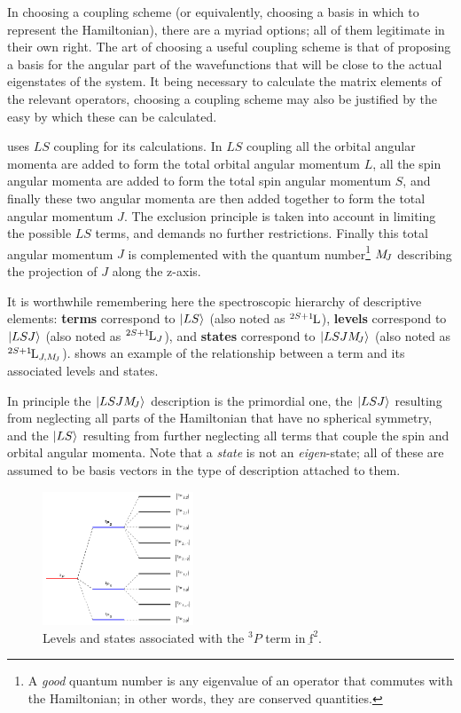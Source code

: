 \documentclass[11pt, twoside,openright]{article}
\begin{document}
In choosing a coupling scheme (or equivalently, choosing a basis in which to represent the Hamiltonian), there are a myriad options; all of them  legitimate in their own right. The art of choosing a useful coupling scheme is that of proposing a basis for the angular part of the wavefunctions that will be close to the actual eigenstates of the system. It being necessary to calculate the matrix elements of the relevant operators, choosing a coupling scheme may also be justified by the easy by which these can be calculated.

\qlanth uses $LS$ coupling for its calculations. In $LS$ coupling all the orbital angular momenta are added to form the total orbital angular momentum $L$, all the spin angular momenta are added to form the total spin angular momentum $S$, and finally these two angular momenta are then added together to form the total angular momentum $J$. The exclusion principle is taken into account in limiting the possible $LS$ terms, and demands no further restrictions. Finally this total angular momentum $J$ is complemented with the quantum number\footnote{A \textit{good} quantum number is any eigenvalue of an operator that commutes with the Hamiltonian; in other words, they are conserved quantities.} $M_{\!{J}}$ describing the projection of $J$ along the z-axis.

It is worthwhile remembering here the spectroscopic hierarchy of descriptive elements: 
\textbf{terms} correspond to $|LS\rangle$ (also noted as ${}^{2S+1}{\kern-0.1em}{\text{L}}$), 
 \textbf{levels} correspond to $|LSJ\rangle$ (also noted as ${}^{2S+1}{\kern-0.1em}{\text{L}}_{J}$), 
 and \textbf{states} correspond to $|LSJM_{\!{J}}\rangle$ (also noted as ${}^{2S+1}{\kern-0.1em}{\text{L}}_{J,M_{\!{J}}}$).  shows an example of the relationship between a term and its associated levels and states.

In principle the  $|LSJM_{\!{J}}\rangle$ description is the primordial one, the $|LSJ\rangle$ resulting from neglecting all parts of the Hamiltonian that have no spherical symmetry, and the $|LS\rangle$ resulting from further neglecting all terms that couple the spin and orbital angular momenta. Note that a \textit{state} is not an \textit{eigen}-state; all of these are assumed to be basis vectors in the type of description attached to them.

\begin{figure}
	\centering
	\includegraphics[width=0.4\textwidth]{./figures/term-level-state.pdf}
	\caption{Levels and states associated with the ${}^3\!P$ term in $\underbar{\text{f}}^2$.}
	\label{fig: terms-level-states} 
\end{figure}
\end{document}
